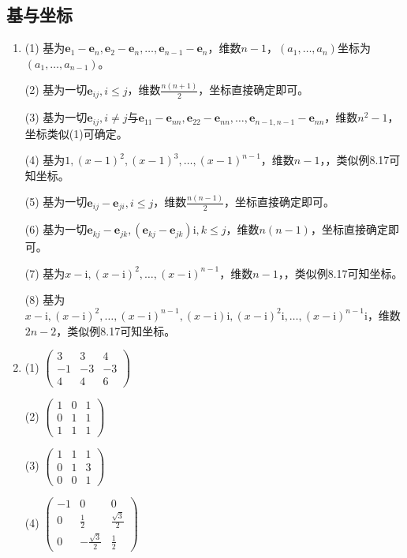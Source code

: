 \documentclass[a4paper,UTF8,fontset=windows]{ctexart}
\begin{document}
\subsection{基与坐标}
\begin{enumerate}
\item
(1) 基为$\mathbf{e}_1-\mathbf{e}_n,\mathbf{e}_2-\mathbf{e}_n,\dots,\mathbf{e}_{n-1}-\mathbf{e}_n$，维数$n-1$，$(a_1,\dots,a_n)$坐标为$(a_1,\dots,a_{n-1})$。

(2) 基为一切$\mathbf{e}_{ij},i\le j$，维数$\frac{n(n+1)}{2}$，坐标直接确定即可。

(3) 基为一切$\mathbf{e}_{ij},i\ne j$与$\mathbf{e}_{11}-\mathbf{e}_{nn},\mathbf{e}_{22}-\mathbf{e}_{nn},\dots,\mathbf{e}_{n-1,n-1}-\mathbf{e}_{nn}$，维数$n^2-1$，坐标类似(1)可确定。

(4) 基为$1,(x-1)^2,(x-1)^3,\dots,(x-1)^{n-1}$，维数$n-1$，，类似例8.17可知坐标。

(5) 基为一切$\mathbf{e}_{ij}-\mathbf{e}_{ji},i\le j$，维数$\frac{n(n-1)}{2}$，坐标直接确定即可。

(6) 基为一切$\mathbf{e}_{kj}-\mathbf{e}_{jk},(\mathbf{e}_{kj}-\mathbf{e}_{jk})\mathrm{i},k\le j$，维数$n(n-1)$，坐标直接确定即可。

(7)  基为$x-\mathrm{i},(x-\mathrm{i})^2,\dots,(x-\mathrm{i})^{n-1}$，维数$n-1$，，类似例8.17可知坐标。

(8) 基为$x-\mathrm{i},(x-\mathrm{i})^2,\dots,(x-\mathrm{i})^{n-1},(x-\mathrm{i})\mathrm{i},(x-\mathrm{i})^2\mathrm{i},\dots,(x-\mathrm{i})^{n-1}\mathrm{i}$，维数$2n-2$，类似例8.17可知坐标。

\item
(1) $\begin{pmatrix}3&3&4\\-1&-3&-3\\4&4&6\end{pmatrix}$

(2) $\begin{pmatrix}1&0&1\\0&1&1\\1&1&1\end{pmatrix}$

(3) $\begin{pmatrix}1&1&1\\0&1&3\\0&0&1\end{pmatrix}$

(4) $\begin{pmatrix}-1&0&0\\0&\frac{1}{2}&\frac{\sqrt3}{2}\\[1.5ex]0&-\frac{\sqrt3}{2}&\frac{1}{2}\end{pmatrix}$


\end{enumerate}
\end{document}

